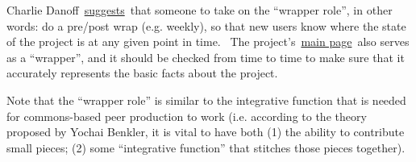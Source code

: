 Charlie
Danoff~\href{http://socialmediaclassroom.com/host/peeragogy/wiki/rolesdivision-labor}{suggests}~that
someone to take on the ``wrapper role'', in other words: do a pre/post
wrap (e.g. weekly), so that new users know where the state of the
project is at any given point in time. ~The
project's~\href{http://socialmediaclassroom.com/host/peeragogy/}{main
page}~also serves as a ``wrapper'', and it should be checked from time
to time to make sure that it accurately represents the basic facts about
the project.

Note that the ``wrapper role'' is similar to the integrative function
that is needed for commons-based peer production to work (i.e. according
to the theory proposed by Yochai Benkler, it is vital to have both (1)
the ability to contribute small pieces; (2) some ``integrative
function'' that stitches those pieces together).

